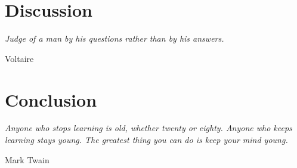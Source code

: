 \documentclass[a4paper]{report}
\begin{document}
\chapter{Discussion}
\label{chap:discussion}
\epigraph{\textit{Judge of a man by his questions rather than by his answers.}}{Voltaire}


\chapter{Conclusion}
\label{chap:conclusion}
\epigraph{\textit{Anyone who stops learning is old, whether twenty or eighty. Anyone who keeps learning stays young. The greatest thing you can do is keep your mind young.}}{Mark Twain}


\clearpage



\newpage
\clearpage
\begin{appendices}

\end{appendices}

%
\end{document}
